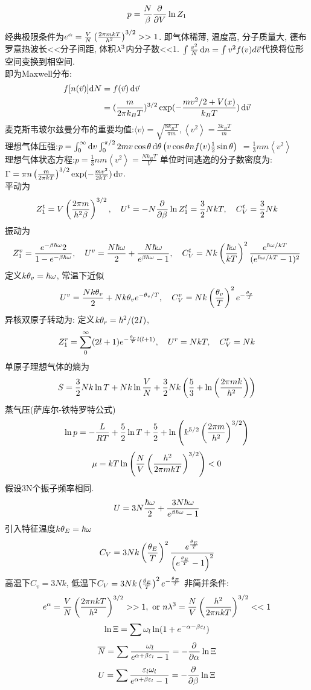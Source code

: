 \documentclass[UTF8,9pt]{ctexart}
\begin{document}
	$$p=\frac{N}{\beta}\frac{\partial^{} }{\partial {V}^{}}\ln Z_1$$
	经典极限条件为$e^\alpha = \frac{V}{N}\left( \frac{2\pi mkT}{h^2} \right)^{3/2}>>1$. 即气体稀薄, 温度高, 分子质量大, 德布罗意热波长<<分子间距, 体积$\lambda^3$内分子数<<1.
$\int \frac{v^2}{N}\mathop{}\!\mathrm{d} n=\int v^2f(v)d\vec{v}$代换将位形空间变换到相空间. \\
即为Maxwell分布:
$$\begin{aligned} f[ n(\vec{v})]{\mathop{}\!\mathrm{d}N}&= f(\vec{v})\mathop{}\!\mathrm{d} \vec v \\
		&=(\frac{m}{2\pi k_BT})^{3/2}\exp (-\frac{mv^2/2+V(x)}{k_BT})\mathop{}\!\mathrm{d} \vec v \end{aligned}$$
麦克斯韦玻尔兹曼分布的重要均值:$\langle v\rangle=\sqrt{\frac{8 k_{B} T}{\pi m}},\left\langle v^{2}\right\rangle=\frac{3 k_{B} T}{m}$\\
理想气体压强:$p=\int_{0}^{\infty} \mathop{}\!\mathrm{d} v \int_{0}^{\pi / 2} 2 m v \cos \theta \mathop{}\!\mathrm{d} \theta\left(v \cos \theta n f(v) \frac{1}{2} \sin \theta\right)$
$=\frac{1}{3} n m\left\langle v^{2}\right\rangle$\\
理想气体状态方程:$p=\frac{1}{3} n m\left\langle v^{2}\right\rangle=\frac{N k_{B} T}{V}$
单位时间逃逸的分子数密度为: $\Gamma = \pi  n \left( \frac{m}{2\pi kT} \right)^{3/2} \exp(-\frac{mv^2}{2kT}) \mathop{}\!\mathrm{d} v$. \\
平动为
$$Z_1^t=V\left( \frac{2\pi m}{h^2\beta} \right)^{3/2},\quad U^t=-N\frac{\partial^{} }{\partial {\beta}^{}}\ln Z_1^t=\frac{3}{2}NkT,\quad C_V^t=\frac{3}{2}Nk$$
振动为
$$Z_1^v=\frac{e^{-\beta\hbar\omega}{2}}{1-e^{-\beta\hbar\omega}},\quad U^v=\frac{N\hbar\omega}{2}+\frac{N\hbar\omega}{e^{\beta\hbar\omega}-1},\quad C_V^t=Nk\left( \frac{\hbar\omega}{kT} \right)^2\frac{e^{\hbar\omega/kT}}{(e^{\hbar\omega/kT}-1)^2}$$
定义$k\theta_v=\hbar\omega$, 常温下近似
$$U^v=\frac{Nk\theta_v}{2}+Nk\theta_ve^{-\theta_v/T},\quad C_V^v=Nk\left( \frac{\theta_v}{T} \right)^2e^{-\frac{\theta_v}{T}}$$
异核双原子转动为: 定义$k\theta_r=\hbar^2/(2I)$,
$$Z_1^r=\sum_0^\infty(2l+1)e^{-\frac{\theta_r}{T}l(l+1)},\quad U^r=NkT,\quad C_V^r=Nk$$
单原子理想气体的熵为
$$S=\frac{3}{2}Nk\ln T+Nk\ln\frac{V}{N}+\frac{3}{2}Nk\left( \frac{5}{3}+\ln\left( \frac{2\pi mk}{h^2} \right) \right)$$
蒸气压(萨库尔-铁特罗特公式)
$$\ln p=-\frac{L}{RT}+\frac{5}{2}\ln T+\frac{5}{2}+\ln\left( k^{5/2}\left( \frac{2\pi m}{h^2} \right)^{3/2} \right)$$
$$\mu=kT\ln\left( \frac{N}{V}\left( \frac{h^2}{2\pi mkT} \right)^{3/2} \right)<0$$
假设3N个振子频率相同. 
$$U=3N\frac{\hbar\omega}{2}+\frac{3N\hbar\omega}{e^{\beta\hbar\omega}-1}$$
引入特征温度$k\theta_E=\hbar\omega$
$$C_V=3Nk\left( \frac{\theta_E}{T} \right)^2\frac{e^{\frac{\theta_E}{T}}}{\left( e^{\frac{\theta_E}{T}}-1 \right)^2}$$
高温下$C_v=3Nk$, 低温下$C_V=3Nk\left( \frac{\theta_E}{T} \right)^2e^{-\frac{\theta_E}{T}}$
非简并条件:
$$e^\alpha = \frac{V}{N}\left(  \frac{2\pi nkT}{h^2}  \right)^{3/2}>>1,\ \text{or}\ n\lambda^3 = \frac{N}{V}\left( \frac{h^2}{2\pi nkT} \right)^{3/2}<<1$$
$$\ln\Xi=\sum\omega_l\ln(1+e^{-\alpha-\beta\varepsilon_l})$$
$$\overline{N} = \sum \frac{\omega_l}{e^{\alpha+\beta\varepsilon_l}-1}=-\frac{\partial^{} }{\partial {\alpha}^{}}\ln\Xi$$
$$U=\sum\frac{\varepsilon_l\omega_l}{e^{\alpha+\beta\varepsilon_l}-1} = -\frac{\partial^{} }{\partial {\beta}^{}}\ln\Xi$$
\end{document}
